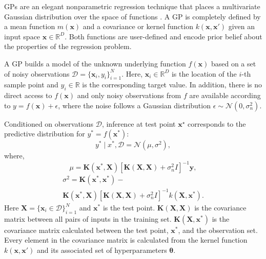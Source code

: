 \documentclass[shortAfour,sageh,times]{sagej_no_sage}
\begin{document}
GPs are an elegant nonparametric regression technique that places a multivariate Gaussian distribution over the space of 
functions \citep{Rasmussen2006}. A GP is completely defined by a mean function $m(\boldsymbol{x})$ and a covariance or kernel function $k(\boldsymbol{x},\boldsymbol{x}')$ given an input space $\boldsymbol{x} \in \mathbb{R}^D$. Both functions are user-defined and encode prior belief about the properties of the regression problem.
 
A GP builds a model of the unknown underlying function $f(\boldsymbol{x})$ based on a set of noisy observations $\mathcal{D}=\{\boldsymbol{x}_i,y_i\}_{i=1}^N$. 
Here, $\boldsymbol{x}_i \in \mathbb{R}^D$ is the location of the $i$-th sample point and $y_i \in \mathbb{R}$ is the corresponding target value. 
In addition, there is no direct access to $f(\boldsymbol{x})$ and only noisy observations from $f$ are available according to $y=f(\boldsymbol{x})+\epsilon$, where the noise follows a Gaussian distribution $\epsilon \sim \mathcal{N}(0,\sigma_n^2)$. 

Conditioned on observations $\mathcal{D}$, inference at test point $\boldsymbol{x}^\star$ corresponds to the predictive distribution for $y^* = f(\boldsymbol{x^*})$: 	
\begin{equation}
		y^* \mid x^*,\mathcal{D} = \mathcal{N}(\mu,\sigma^2),
\end{equation}
where,
\begin{equation}\label{eq:GP_mu}
			\mu = \boldsymbol{K}(\boldsymbol{x^*},\boldsymbol{X})[\boldsymbol{K}(\boldsymbol{X},\boldsymbol{X})+\sigma_n^2\mathit{I}]^{-1}\boldsymbol{y},
\end{equation}
\begin{multline}\label{eq:GP_sigma}
			\sigma^2 = \boldsymbol{K}(\boldsymbol{x^*},\boldsymbol{x^*})- \\
					\boldsymbol{K}(\boldsymbol{x^*},\boldsymbol{X})[\boldsymbol{K}(\boldsymbol{X},\boldsymbol{X})+\sigma_n^2\mathit{I}]^{-1}k(\boldsymbol{X},\boldsymbol{x^*}).
\end{multline}	
Here $\boldsymbol{X} = \{\boldsymbol{x}_i \in \mathcal{D}\}_{i=1}^N$ and $\boldsymbol{x^*}$ is the test point. $\boldsymbol{K}(\boldsymbol{X},\boldsymbol{X})$ is the covariance matrix between all pairs of inputs in the training set. $\boldsymbol{K}(\boldsymbol{X},\boldsymbol{x^*})$ is the covariance matrix calculated between the test point, $\boldsymbol{x^*}$, and the observation set. Every element in the covariance matrix is calculated from the kernel function $k(\boldsymbol{x},\boldsymbol{x}')$ and its associated set of hyperparameters $\boldsymbol{\theta}$.
	
\end{document}
